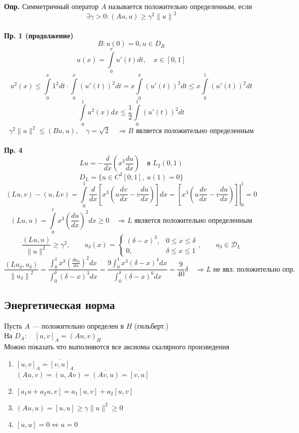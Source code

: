 \textbf{Опр.} Симметричный оператор $A$ называется положительно определенным, если
\begin{equation}
	\exists \gamma > 0 : (Au, u) \geq \gamma^2 {\|u\|}^2
\end{equation} \\
\textbf{Пр. 1 (продолжение)}
\[ B: u(0) = 0, u \in D_B \]
\[ u(x) = \int\limits_{0}^{x } u'(t) dt, \quad x \in [0, 1] \]
\[ u^2(x) \leq \int\limits_{0}^{x} 1^2 dt \cdot \int\limits_{0}^{x} {(u'(t))}^2 dt = x \int\limits_{0}^{x} {(u'(t))}^2 dt \leq x \int\limits_{0}^{1} {(u'(t))}^2 dt \]
\[ \int\limits_{0}^{1} u^2 (x) dx \leq \frac{1}{2} \int\limits_{0}^{1} {(u'(t))}^2 dt \]
\[ \gamma^2 \|u\|^2 \leq (Bu, u) , \quad \gamma = \sqrt{2} \quad \Rightarrow B \text{ является положительно определенным} \] \\
\textbf{Пр. 4}
\[ Lu = - \frac{d }{ d x } \left(x^3 \frac{du}{dx}\right) \quad \text{в } L_2 (0,1) \]
\[ D_L = \{u \in C^2[0,1], \ u(1) = 0 \} \]
\[(Lu, v) - (u, Lv) = \int\limits_{0}^{1} \frac{d}{dx} \left[ x^3 \left(u \frac{dv }{dx } - v \frac{du }{dx } \right)  \right] dx = \left. \left[ x^3 \left(u \frac{dv }{dx } - v \frac{du }{dx } \right) \right] \right|_0^1 = 0\]
\[ (Lu, u) = \int\limits_{0}^{1} x^3 {\left(\frac{du }{dx }\right)}^2 dx \geq 0 \quad \Rightarrow L \text{ является положительно определенным} \]
\[ \frac{(Lu, u)}{\|u\|^2} \geq \gamma^2, \qquad u_\delta (x) = \begin{cases}
	(\delta - x)^3, & 0 \leq x \leq \delta \\
	0, & \delta \leq x \leq 1
\end{cases}, \qquad u_\delta \in \mathcal{D}_L  \]
\[ \frac{(Lu_\delta , u_\delta)}{{\|u_\delta\|}^2}  = \frac{\int_{0}^{1} x^3 {(\frac{du_\delta}{dx})}^2 dx}{\int_{0}^{\delta} {(\delta -x)}^3 dx} = \frac{9 \int_{0}^{1} x^3 {(\delta -x)}^4 dx}{\int_{0}^{\delta} {(\delta -x)}^6 dx} = \frac{9}{40} \delta \quad \Rightarrow L \text{ не явл. положительно опр.} \]

\newpage

\subsection{Энергетическая норма}
Пусть $A$ --- положительно определен в $H$ (гильберт.) \\
На $D_A: \quad {[u, v]}_A = {(A u, v)}_H$ \\
Можно показать что выполняются все аксиомы скалярного произведения

\begin{enumerate}
	\item $ {[u, v]}_A = \overline{[v, u]}_A $ \\
	$ (Au, v) = (u, Av) = \overline{(Av, u)} = \overline{[v, u]} $
	\item $ [a_1 u + a_2 u, v] = a_1[u, v] + a_2[u, v]$
	\item $ (Au, u) = [u, u] \geq \gamma \|u\|^2 \geq 0 $
	\item $ [u, u] = 0 \Leftrightarrow u = 0 $
\end{enumerate}

